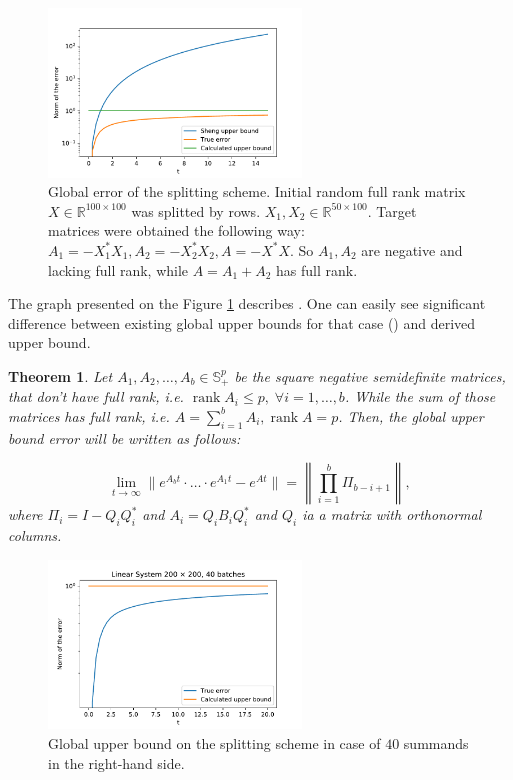 \documentclass{article} %
\newtheorem{theorem}{Theorem}
\begin{document}
\begin{figure}[h!]
	\centering
	\includegraphics[width=0.6\textwidth]{upper_bound_2.pdf}
	\caption{Global error of the splitting scheme. Initial random full rank matrix $X \in \mathbb{R}^{100 \times 100}$ was splitted by rows. $X_1, X_2 \in \mathbb{R}^{50 \times 100}$. Target matrices were obtained the following way: $A_1 = -X_1^*X_1, A_2 = -X_2^*X_2, A = -X^*X$. So $A_1, A_2$ are negative and lacking full rank, while $A = A_1 + A_2$ has full rank.}
	\label{strang:fig:upper_bound_2}
\end{figure}

The graph presented on the Figure \ref{strang:fig:upper_bound_2} describes . One can easily see significant difference between existing global upper bounds for that case (\cite{sheng1994global}) and derived upper bound.

\begin{theorem}\label{strang:theorem_uppbound}
	Let $A_1, A_2, \ldots, A_b \in \mathbb{S}^p_{+}$ be the square negative semidefinite matrices, that don't have full rank, i.e. $\operatorname{rank}{A_i} \leq p, \;\forall i = 1, \ldots, b$. While the sum of those matrices has full rank, i.e. $A = \sum\limits_{i=1}^b A_i, \operatorname{rank}{A} = p$. Then, the global upper bound error will be written as follows:

	\begin{equation}\label{strang:global_error_upper_bound}
		\lim_{t \to \infty}\| e^{A_bt} \cdot \ldots \cdot e^{A_1t} - e^{At}\| = \left\|\prod\limits_{i=1}^b \Pi_{b-i+1}\right\|,
	\end{equation}
	where $\Pi_i = I - Q_iQ_i^*$ and $A_i = Q_iB_iQ_i^*$ and $Q_i$ ia a matrix with orthonormal columns. 
\end{theorem}

\begin{figure}[h!]
	\centering
	\includegraphics[width=0.6\textwidth]{upper_bound_many.pdf}
	\caption{Global upper bound on the splitting scheme in case of $40$ summands in the right-hand side. }
	\label{strang:fig:upper_bound_many}
\end{figure}
\end{document}

